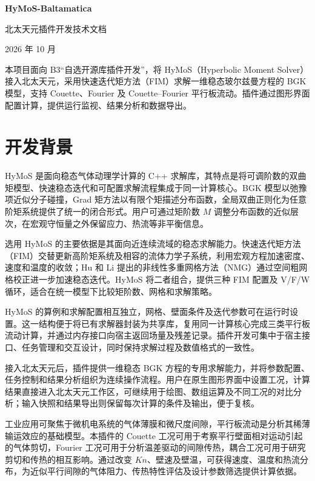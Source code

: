 \documentclass[UTF8,a4paper,11pt,fontset=fandol]{ctexart}
\newcommand{\Kn}{\mathit{Kn}}
\begin{document}
\pagestyle{plain}
\begin{center}
{\LARGE\bfseries HyMoS-Baltamatica\par}
\vspace{0.5em}
{\large 北太天元插件开发技术文档\par}
\vspace{0.6em}
{\small  2026 年 10 月}
\end{center}
\noindent 本项目面向 B3“自选开源库插件开发”，将 HyMoS（Hyperbolic Moment Solver）接入北太天元，采用快速迭代矩方法（FIM）求解一维稳态玻尔兹曼方程的 BGK 模型，支持 Couette、Fourier 及 Couette--Fourier 平行板流动。插件通过图形界面配置计算，提供运行监视、结果分析和数据导出。

\section{开发背景}
HyMoS 是面向稳态气体动理学计算的 C++ 求解库，其特点是将可调阶数的双曲矩模型、快速稳态迭代和可配置求解流程集成于同一计算核心。BGK 模型以弛豫项近似分子碰撞\cite{bgk1954}，Grad 矩方法以有限个矩描述分布函数\cite{grad1949}，全局双曲正则化为任意阶矩系统提供了统一的闭合形式\cite{cai2014}。用户可通过矩阶数 $M$ 调整分布函数的近似层次，在宏观守恒量之外保留应力、热流等非平衡信息。

选用 HyMoS 的主要依据是其面向近连续流域的稳态求解能力。快速迭代矩方法（FIM）交替更新高阶矩系统及相容的流体力学子系统，利用宏观方程加速密度、速度和温度的收敛\cite{li2026}；Hu 和 Li 提出的非线性多重网格方法（NMG）通过空间粗网格校正进一步加速稳态迭代\cite{hu2014}。HyMoS 将二者组合，提供三种 FIM 配置及 V/F/W 循环，适合在统一模型下比较矩阶数、网格和求解策略。

HyMoS 的算例和求解配置相互独立，网格、壁面条件及迭代参数可在运行时设置。这一结构便于将已有求解器封装为共享库，复用同一计算核心完成三类平行板流动计算，并通过内存接口向宿主返回场量及残差记录。插件开发可集中于宿主接口、任务管理和交互设计，同时保持求解过程及数值格式的一致性。

接入北太天元后，插件提供一维稳态 BGK 方程的专用求解能力，并将参数配置、任务控制和结果分析组织为连续操作流程。用户在原生图形界面中设置工况，计算结果直接进入北太天元工作区，可继续用于绘图、数组运算及不同工况的对比分析；输入快照和结果导出则保留每次计算的条件及输出，便于复核。

工业应用可聚焦于微机电系统的气体薄膜和微尺度间隙，平行板流动是分析其稀薄输运效应的基础模型\cite{cercignani2006}。本插件的 Couette 工况可用于考察平行壁面相对运动引起的气体剪切，Fourier 工况可用于分析温差驱动的间隙传热，耦合工况可用于研究剪切和传热的相互影响。通过改变 $\Kn$、壁速及壁温，可获得速度、温度和热流分布，为近似平行间隙的气体阻力、传热特性评估及设计参数筛选提供计算依据。
\end{document}

